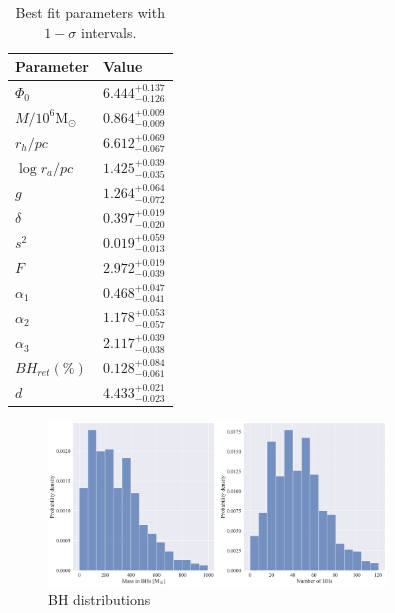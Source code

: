 \begin{table}
	\centering
	\caption{Best fit parameters with $1-\sigma$ intervals.}
	\begin{tabular}{l l}

		\hline
		Parameter                 & Value                     \\
		\hline
		$\Phi_0$                  & $6.444^{+0.137}_{-0.126}$ \\
		$M/10^6 \mathrm{M}_\odot$ & $0.864^{+0.009}_{-0.009}$ \\
		$r_h / pc$                & $6.612^{+0.069}_{-0.067}$ \\
		$\log{r_a / pc}$          & $1.425^{+0.039}_{-0.035}$ \\
		$g$                       & $1.264^{+0.064}_{-0.072}$ \\
		$\delta$                  & $0.397^{+0.019}_{-0.020}$ \\
		$s^2$                     & $0.019^{+0.059}_{-0.013}$ \\
		$F$                       & $2.972^{+0.019}_{-0.039}$ \\
		$\alpha_1$                & $0.468^{+0.047}_{-0.041}$ \\
		$\alpha_2$                & $1.178^{+0.053}_{-0.057}$ \\
		$\alpha_3$                & $2.117^{+0.039}_{-0.038}$ \\
		$BH_{ret} (\%)$           & $0.128^{+0.084}_{-0.061}$ \\
		$d$                       & $4.433^{+0.021}_{-0.023}$ \\
		\hline
	\end{tabular}
	\label{tab:parameters_nobin}
\end{table}

\begin{figure}
	\centering
	\includegraphics[width=0.8\textwidth]{figures/prev_nobin/BH_dists.png}
	\caption{BH distributions}
	\label{fig:prev_nobin_BH_dists}
\end{figure}


